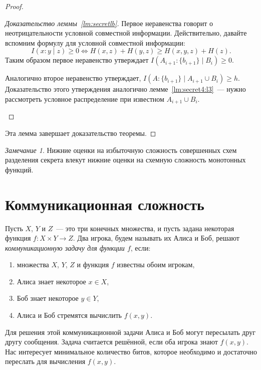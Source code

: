 \documentclass[12pt]{article}
\theoremstyle{definition}
\theoremstyle{plain}
\theoremstyle{remark}
\newtheorem{remark}{Замечание}[section]
\begin{document}
\begin{proof}
\begin{proof}[Доказательство леммы~\ref{lm:secretlb}]
        Первое неравенства говорит о неотрицательности условной совместной информации.
        Действительно, давайте вспомним формулу для условной совместной информации:
        \[
            I(x:y\mid z) \ge 0 \iff H(x,z) + H(y,z)\ge H(x,y,z) + H(z).
        \]
        Таким образом первое неравенство утверждает $I(A_{i+1}:\{b_{i+1}\}\mid B_i)\ge 0$.

        Аналогично второе неравенство утверждает, $I(A:\{b_{i+1}\}\mid A_{i+1}\cup B_i)\ge h$.
        Доказательство этого утверждения аналогично лемме~\ref{lm:secret4:l3}~--- нужно рассмотреть
        условное распределение при известном $A_{i+1}\cup B_i$.
    \begin{center}
    \end{center}
    \end{proof}
    Эта лемма завершает доказательство теоремы.
\end{proof}
    \begin{remark}
        Нижние оценки на избыточную сложность совершенных схем разделения
        секрета влекут нижние оценки на схемную сложность монотонных функций.
    \end{remark}

\section{Коммуникационная сложность}
Пусть $X$, $Y$ и $Z$~--- это три конечных множества, и пусть задана некоторая функция $f:X\times Y \to Z$.
Два игрока, будем называть их Алиса и Боб, решают \emph{коммуникационную задачу для функции $f$}, если:
\begin{enumerate}
    \item множества $X$, $Y$, $Z$ и функция $f$ известны обоим игрокам,
    \item Алиса знает некоторое $x\in X$,
    \item Боб знает некоторое $y\in Y$,
    \item Алиса и Боб стремятся вычислить $f(x,y)$.
\end{enumerate}
Для решения этой коммуникационной задачи Алиса и Боб могут пересылать друг другу сообщения.
Задача считается решённой, если оба игрока знают $f(x,y)$.
Нас интересует минимальное количество битов, которое необходимо и достаточно переслать
для вычисления $f(x,y)$.
\end{document}
